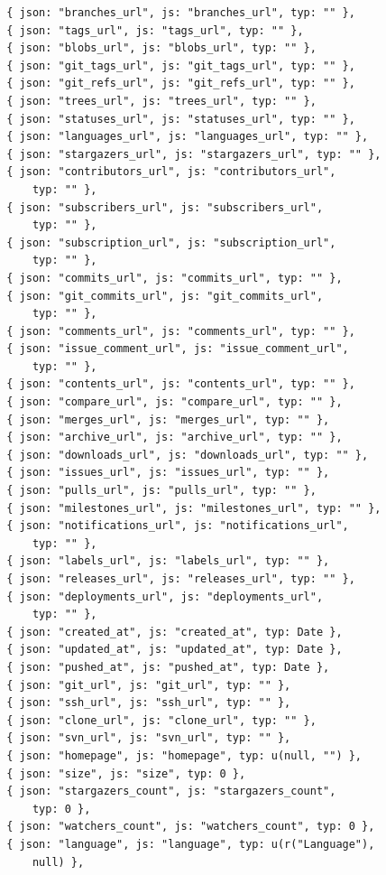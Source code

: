 \begin{lstlisting}
        { json: "branches_url", js: "branches_url", typ: "" },
        { json: "tags_url", js: "tags_url", typ: "" },
        { json: "blobs_url", js: "blobs_url", typ: "" },
        { json: "git_tags_url", js: "git_tags_url", typ: "" },
        { json: "git_refs_url", js: "git_refs_url", typ: "" },
        { json: "trees_url", js: "trees_url", typ: "" },
        { json: "statuses_url", js: "statuses_url", typ: "" },
        { json: "languages_url", js: "languages_url", typ: "" },
        { json: "stargazers_url", js: "stargazers_url", typ: "" },
        { json: "contributors_url", js: "contributors_url",
            typ: "" },
        { json: "subscribers_url", js: "subscribers_url",
            typ: "" },
        { json: "subscription_url", js: "subscription_url",
            typ: "" },
        { json: "commits_url", js: "commits_url", typ: "" },
        { json: "git_commits_url", js: "git_commits_url",
            typ: "" },
        { json: "comments_url", js: "comments_url", typ: "" },
        { json: "issue_comment_url", js: "issue_comment_url",
            typ: "" },
        { json: "contents_url", js: "contents_url", typ: "" },
        { json: "compare_url", js: "compare_url", typ: "" },
        { json: "merges_url", js: "merges_url", typ: "" },
        { json: "archive_url", js: "archive_url", typ: "" },
        { json: "downloads_url", js: "downloads_url", typ: "" },
        { json: "issues_url", js: "issues_url", typ: "" },
        { json: "pulls_url", js: "pulls_url", typ: "" },
        { json: "milestones_url", js: "milestones_url", typ: "" },
        { json: "notifications_url", js: "notifications_url",
            typ: "" },
        { json: "labels_url", js: "labels_url", typ: "" },
        { json: "releases_url", js: "releases_url", typ: "" },
        { json: "deployments_url", js: "deployments_url",
            typ: "" },
        { json: "created_at", js: "created_at", typ: Date },
        { json: "updated_at", js: "updated_at", typ: Date },
        { json: "pushed_at", js: "pushed_at", typ: Date },
        { json: "git_url", js: "git_url", typ: "" },
        { json: "ssh_url", js: "ssh_url", typ: "" },
        { json: "clone_url", js: "clone_url", typ: "" },
        { json: "svn_url", js: "svn_url", typ: "" },
        { json: "homepage", js: "homepage", typ: u(null, "") },
        { json: "size", js: "size", typ: 0 },
        { json: "stargazers_count", js: "stargazers_count",
            typ: 0 },
        { json: "watchers_count", js: "watchers_count", typ: 0 },
        { json: "language", js: "language", typ: u(r("Language"),
            null) },

\end{lstlisting}
